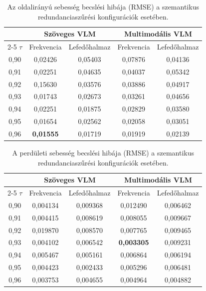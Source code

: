 \documentclass[12pt,a4paper,onehalfspacing, oneside]{book} %
\begin{document}
\begin{table}[htbp]
    \centering
    \caption{Az oldalirányú sebesség becslési hibája (RMSE) a szemantikus redundanciaszűrési konfigurációk esetében.}
    \label{tab:vlm_rmse_vy}
    \small
    \setlength{\tabcolsep}{5pt}
    \begin{tabular}{ccccc}
        \hline
        & \multicolumn{2}{c}{Szöveges VLM} & \multicolumn{2}{c}{Multimodális VLM} \\
        \cline{2-5}
        $\tau$ & Frekvencia & Lefedőhalmaz & Frekvencia & Lefedőhalmaz \\
        \hline
        0,90 & 0,02426 & 0,05403 & 0,07876 & 0,04136 \\
        0,91 & 0,02251 & 0,04635 & 0,04037 & 0,05342 \\
        0,92 & 0,15630 & 0,03576 & 0,03886 & 0,04917 \\
        0,93 & 0,01743 & 0,02673 & 0,03261 & 0,04656 \\
        0,94 & 0,02251 & 0,01875 & 0,02829 & 0,03580 \\
        0,95 & 0,01654 & 0,02562 & 0,02058 & 0,03051 \\
        0,96 & \textbf{0,01555} & 0,01719 & 0,01919 & 0,02139 \\
        \hline
    \end{tabular}
\end{table}

\begin{table}[htbp]
    \centering
    \caption{A perdületi sebesség becslési hibája (RMSE) a szemantikus redundanciaszűrési konfigurációk esetében.}
    \label{tab:vlm_rmse_yaw}
    \small
    \setlength{\tabcolsep}{5pt}
    \begin{tabular}{ccccc}
        \hline
        & \multicolumn{2}{c}{Szöveges VLM} & \multicolumn{2}{c}{Multimodális VLM} \\
        \cline{2-5}
        $\tau$ & Frekvencia & Lefedőhalmaz & Frekvencia & Lefedőhalmaz \\
        \hline
        0,90 & 0,004134 & 0,009368 & 0,012490 & 0,006462 \\
        0,91 & 0,004415 & 0,008619 & 0,008055 & 0,009667 \\
        0,92 & 0,019870 & 0,008570 & 0,007765 & 0,009465 \\
        0,93 & 0,004102 & 0,006542 & \textbf{0,003305} & 0,009231 \\
        0,94 & 0,005467 & 0,005161 & 0,006864 & 0,006194 \\
        0,95 & 0,004423 & 0,002433 & 0,005296 & 0,006481 \\
        0,96 & 0,003753 & 0,004655 & 0,004964 & 0,004882 \\
        \hline
    \end{tabular}
\end{table}
\end{document}
